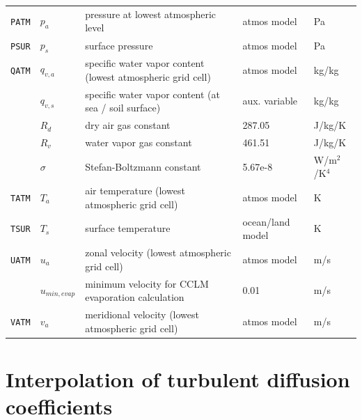 \documentclass[a4paper,titlepage]{scrartcl}
\begin{document}
\begin{tabular}{lllll}
	\texttt{PATM} & $p_a$          & pressure at lowest atmospheric level                        & atmos model      & Pa      \\
  \texttt{PSUR} & $p_s$          & surface pressure                                            & atmos model      & Pa      \\
  \texttt{QATM} & $q_{v,a}$      & specific water vapor content (lowest atmospheric grid cell) & atmos model      & kg/kg   \\
                & $q_{v,s}$      & specific water vapor content (at sea / soil surface)        & aux. variable    & kg/kg   \\
                & $R_d$          & dry air gas constant                                        & 287.05           & J/kg/K  \\
                & $R_v$          & water vapor gas constant                                    & 461.51           & J/kg/K  \\
								& $\sigma$       & Stefan-Boltzmann constant                                   & 5.67e-8          & W/m$^2$/K$^4$ \\
	\texttt{TATM} & $T_a$          & air temperature (lowest atmospheric grid cell)              & atmos model      & K       \\
	\texttt{TSUR} & $T_s$          & surface temperature                                         & ocean/land model & K       \\
  \texttt{UATM} & $u_a$          & zonal velocity (lowest atmospheric grid cell)               & atmos model      & m/s     \\
	              & $u_{min,evap}$ & minimum velocity for CCLM evaporation calculation           & 0.01             & m/s     \\
  \texttt{VATM} & $v_a$          & meridional velocity (lowest atmospheric grid cell)          & atmos model      & m/s     \\
  \hline \hline
\end{tabular}
\normalsize

\section{Interpolation of turbulent diffusion coefficients}
\end{document}
